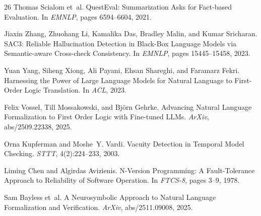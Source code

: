 \documentclass[11pt,letterpaper]{article}
\begin{document}
\begin{thebibliography}{26}
Thomas Scialom et~al.
\newblock QuestEval: Summarization Asks for Fact-based Evaluation.
\newblock In \emph{EMNLP}, pages 6594--6604, 2021.

Jiaxin Zhang, Zhuohang Li, Kamalika Das, Bradley Malin, and Kumar Sricharan.
\newblock SAC3: Reliable Hallucination Detection in Black-Box Language Models via Semantic-aware Cross-check Consistency.
\newblock In \emph{EMNLP}, pages 15445--15458, 2023.

Yuan Yang, Siheng Xiong, Ali Payani, Ehsan Shareghi, and Faramarz Fekri.
\newblock Harnessing the Power of Large Language Models for Natural Language to First-Order Logic Translation.
\newblock In \emph{ACL}, 2023.

Felix Vossel, Till Mossakowski, and Bj\"orn Gehrke.
\newblock Advancing Natural Language Formalization to First Order Logic with Fine-tuned LLMs.
\newblock \emph{ArXiv}, abs/2509.22338, 2025.

Orna Kupferman and Moshe~Y. Vardi.
\newblock Vacuity Detection in Temporal Model Checking.
\newblock \emph{STTT}, 4(2):224--233, 2003.

Liming Chen and Algirdas Avizienis.
\newblock N-Version Programming: A Fault-Tolerance Approach to Reliability of Software Operation.
\newblock In \emph{FTCS-8}, pages 3--9, 1978.

Sam Bayless et~al.
\newblock A Neurosymbolic Approach to Natural Language Formalization and Verification.
\newblock \emph{ArXiv}, abs/2511.09008, 2025.

\end{thebibliography}
\end{document}
